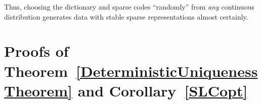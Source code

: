 \documentclass[9pt,twocolumn]{pnas-new}
\newtheorem{theorem}{Theorem}
\begin{document}
Thus, choosing the dictionary and sparse codes ``randomly'' from \emph{any} continuous distribution generates data with stable sparse representations almost certainly.


%


\section{Proofs of Theorem~\ref{DeterministicUniquenessTheorem} and Corollary~\ref{SLCopt}}\label{DUT}
\end{document}
